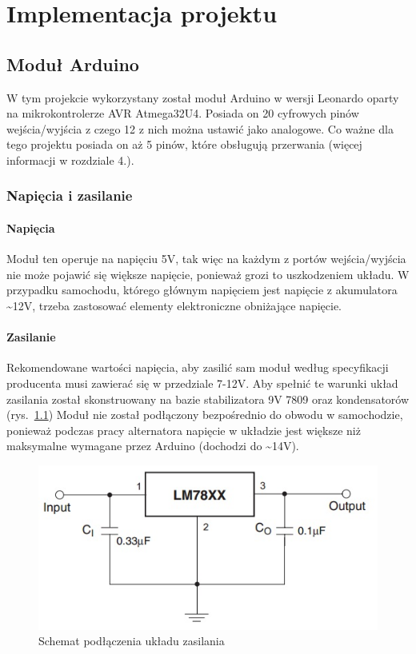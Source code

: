 \chapter{Implementacja projektu}
\section{Moduł Arduino}
W tym projekcie wykorzystany został moduł Arduino w wersji Leonardo oparty na mikrokontrolerze AVR Atmega32U4. Posiada on 20 cyfrowych pinów wejścia/wyjścia z czego 12 z nich można ustawić jako analogowe. Co ważne dla tego projektu posiada on aż 5 pinów, które obsługują przerwania (więcej informacji w rozdziale 4.).
\subsection{Napięcia i zasilanie}
\subsubsection{Napięcia}
Moduł ten operuje na napięciu 5V, tak więc na każdym z portów wejścia/wyjścia nie może pojawić się większe napięcie, ponieważ grozi to uszkodzeniem układu. W przypadku samochodu, którego głównym napięciem jest napięcie z akumulatora \textasciitilde12V, trzeba zastosować elementy elektroniczne obniżające napięcie.
\subsubsection{Zasilanie}
Rekomendowane wartości napięcia, aby zasilić sam moduł według specyfikacji producenta musi zawierać się w przedziale 7-12V. Aby spełnić te warunki układ zasilania został skonstruowany na bazie stabilizatora 9V 7809 oraz kondensatorów (rys.~\ref{fig:LM78XX}) Moduł nie został podłączony bezpośrednio do obwodu w samochodzie, ponieważ podczas pracy alternatora napięcie w układzie jest większe niż maksymalne wymagane przez Arduino (dochodzi do \textasciitilde14V).

\begin{figure}[!htb]
\centering
\includegraphics[width=0.7\linewidth]{Rysunki/78xx.jpg}
\caption{Schemat podłączenia układu zasilania \cite{LM78XX}}
\label{fig:LM78XX}
\end{figure}

